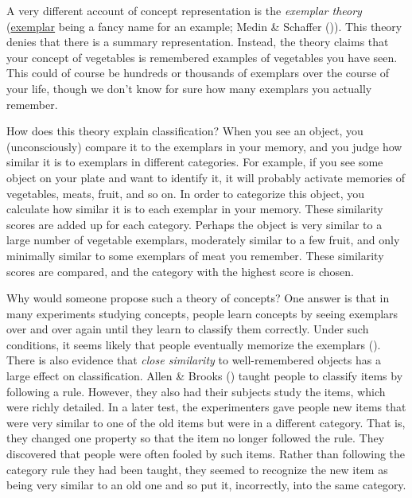 \documentclass[
]{krantz}
\begin{document}
A very different account of concept representation is the \emph{exemplar theory} (\hyperref[exemplar]{exemplar} being a fancy name for an example; Medin \& Schaffer ()). This theory denies that there is a summary representation. Instead, the theory claims that your concept of vegetables is remembered examples of vegetables you have seen. This could of course be hundreds or thousands of exemplars over the course of your life, though we don't know for sure how many exemplars you actually remember.

How does this theory explain classification? When you see an object, you (unconsciously) compare it to the exemplars in your memory, and you judge how similar it is to exemplars in different categories. For example, if you see some object on your plate and want to identify it, it will probably activate memories of vegetables, meats, fruit, and so on. In order to categorize this object, you calculate how similar it is to each exemplar in your memory. These similarity scores are added up for each category. Perhaps the object is very similar to a large number of vegetable exemplars, moderately similar to a few fruit, and only minimally similar to some exemplars of meat you remember. These similarity scores are compared, and the category with the highest score is chosen.

Why would someone propose such a theory of concepts? One answer is that in many experiments studying concepts, people learn concepts by seeing exemplars over and over again until they learn to classify them correctly. Under such conditions, it seems likely that people eventually memorize the exemplars (). There is also evidence that \emph{close similarity} to well-remembered objects has a large effect on classification. Allen \& Brooks () taught people to classify items by following a rule. However, they also had their subjects study the items, which were richly detailed. In a later test, the experimenters gave people new items that were very similar to one of the old items but were in a different category. That is, they changed one property so that the item no longer followed the rule. They discovered that people were often fooled by such items. Rather than following the category rule they had been taught, they seemed to recognize the new item as being very similar to an old one and so put it, incorrectly, into the same category.
\end{document}
